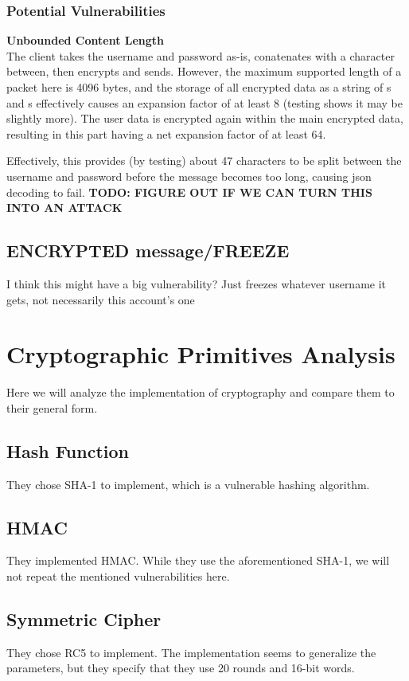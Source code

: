 \documentclass{article}
\newcommand{\code}[1]{\tcbox[
    on line,
    colback=codebackground, boxsep=2pt,
    colframe=white, boxrule=0pt,
    top=0pt, bottom=0pt, left=0pt, right=0pt
]{\texttt{#1}}}
\begin{document}
\subsubsection{Potential Vulnerabilities}
\textbf{Unbounded Content Length} \\
The client takes the username and password as-is, conatenates with a \code{/} character between, then encrypts and sends.
However, the maximum supported length of a packet here is 4096 bytes,
and the storage of all encrypted data as a string of \code{1}s and \code{0}s effectively causes an expansion factor
of at least 8 (testing shows it may be slightly more). The user data is encrypted again within the main encrypted data,
resulting in this part having a net expansion factor of at least 64.

Effectively, this provides (by testing) about 47 characters to be split between the username and password before
the message becomes too long, causing json decoding to fail. \textbf{TODO: FIGURE OUT IF WE CAN TURN THIS INTO AN ATTACK}

\subsection{ENCRYPTED message/FREEZE}
I think this might have a big vulnerability? Just freezes whatever username it gets, not necessarily this account's one

\section{Cryptographic Primitives Analysis}
Here we will analyze the implementation of cryptography and compare them to their general form.
\subsection{Hash Function}
They chose SHA-1 to implement, which is a vulnerable hashing algorithm.

\subsection{HMAC}
They implemented HMAC. While they use the aforementioned SHA-1, we will not repeat the mentioned vulnerabilities here.

\subsection{Symmetric Cipher}
They chose RC5 to implement. The implementation seems to generalize the parameters, but they specify that they use 20 rounds and 16-bit words.
\end{document}
